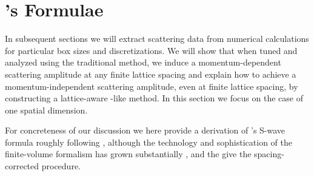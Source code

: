 \section{\Luscher's Formulae}\label{sec:luescher}

In subsequent sections we will extract scattering data from numerical calculations for particular box sizes and discretizations.
We will show that when tuned and analyzed using the traditional \Luscher method, we induce a momentum-dependent scattering amplitude at any finite lattice spacing and explain how to achieve a momentum-independent scattering amplitude, even at finite lattice spacing, by constructing a lattice-aware \Luscher-like method.
In this section we focus on the case of one spatial dimension.

For concreteness of our discussion we here provide a derivation of \Luscher's S-wave formula roughly following , although the technology and sophistication of the finite-volume formalism has grown substantially \cite{Zhu:2019dho}, and the give the spacing-corrected procedure.



